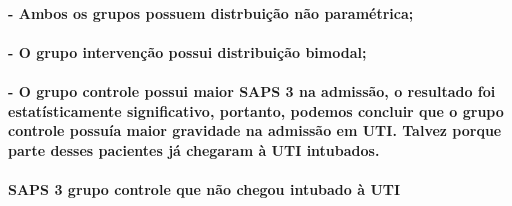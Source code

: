\documentclass[
]{article}
\newenvironment{Shaded}{\begin{snugshade}}{\end{snugshade}}
\newcommand{\AttributeTok}[1]{\textcolor[rgb]{0.77,0.63,0.00}{#1}}
\newcommand{\FunctionTok}[1]{\textcolor[rgb]{0.00,0.00,0.00}{#1}}
\newcommand{\NormalTok}[1]{#1}
\newcommand{\SpecialCharTok}[1]{\textcolor[rgb]{0.00,0.00,0.00}{#1}}
\newcommand{\StringTok}[1]{\textcolor[rgb]{0.31,0.60,0.02}{#1}}
\begin{document}
\hypertarget{ambos-os-grupos-possuem-distrbuiuxe7uxe3o-nuxe3o-paramuxe9trica}{%
\paragraph{- Ambos os grupos possuem distrbuição não
paramétrica;}\label{ambos-os-grupos-possuem-distrbuiuxe7uxe3o-nuxe3o-paramuxe9trica}}

\hypertarget{o-grupo-intervenuxe7uxe3o-possui-distribuiuxe7uxe3o-bimodal}{%
\paragraph{- O grupo intervenção possui distribuição
bimodal;}\label{o-grupo-intervenuxe7uxe3o-possui-distribuiuxe7uxe3o-bimodal}}

\hypertarget{o-grupo-controle-possui-maior-saps-3-na-admissuxe3o-o-resultado-foi-estatuxedsticamente-significativo-portanto-podemos-concluir-que-o-grupo-controle-possuuxeda-maior-gravidade-na-admissuxe3o-em-uti.-talvez-porque-parte-desses-pacientes-juxe1-chegaram-uxe0-uti-intubados.}{%
\paragraph{- O grupo controle possui maior SAPS 3 na admissão, o
resultado foi estatísticamente significativo, portanto, podemos concluir
que o grupo controle possuía maior gravidade na admissão em UTI. Talvez
porque parte desses pacientes já chegaram à UTI
intubados.}\label{o-grupo-controle-possui-maior-saps-3-na-admissuxe3o-o-resultado-foi-estatuxedsticamente-significativo-portanto-podemos-concluir-que-o-grupo-controle-possuuxeda-maior-gravidade-na-admissuxe3o-em-uti.-talvez-porque-parte-desses-pacientes-juxe1-chegaram-uxe0-uti-intubados.}}

\hypertarget{saps-3-grupo-controle-que-nuxe3o-chegou-intubado-uxe0-uti}{%
\paragraph{\texorpdfstring{\textbf{SAPS 3 grupo controle que não chegou
intubado à
UTI}}{SAPS 3 grupo controle que não chegou intubado à UTI}}\label{saps-3-grupo-controle-que-nuxe3o-chegou-intubado-uxe0-uti}}

\begin{Shaded}
\end{Shaded}
\end{document}
